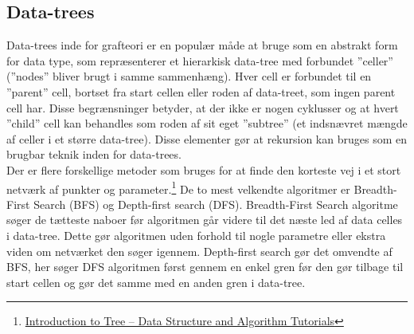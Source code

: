 \documentclass[12pt]{article}
\begin{document}
\subsection{Data-trees}
Data-trees inde for grafteori er en populær måde at bruge som en abstrakt form for data type, som repræsenterer et hierarkisk data-tree med forbundet ”celler” (”nodes” bliver brugt i samme sammenhæng). Hver cell er forbundet til en ”parent” cell, bortset fra start cellen eller roden af data-treet, som ingen parent cell har. Disse begrænsninger betyder, at der ikke er nogen cyklusser og at hvert ”child” cell kan behandles som roden af sit eget ”subtree” (et indsnævret  mængde af celler i et større data-tree). Disse elementer gør at rekursion kan bruges som en brugbar teknik inden for data-trees.\\
Der er flere forskellige metoder som bruges for at finde den korteste vej i et stort netværk af punkter og parameter.\footnote{\href{https://www.geeksforgeeks.org/introduction-to-tree-data-structure-and-algorithm-tutorials/}{Introduction to Tree – Data Structure and Algorithm Tutorials}}  
De to mest velkendte algoritmer er Breadth-First Search (BFS) og Depth-first search (DFS). 
Breadth-First Search algoritme søger de tætteste naboer før algoritmen går videre til det næste led af data celles i data-tree. Dette gør algoritmen uden forhold til nogle parametre eller ekstra viden om netværket den søger igennem. Depth-first search gør det omvendte af BFS, her søger DFS algoritmen først gennem en enkel gren før den gør tilbage til start cellen og gør det samme med en anden gren i data-tree. 
\begin{figure}[ht]%
  \centering
  \label{fig:datatree}%
\end{figure}
\end{document}
